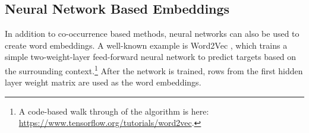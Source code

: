 \subsection{Neural Network Based Embeddings}

In addition to co-occurrence based methods, neural networks can also be used to create word embeddings. A well-known example is Word2Vec \cite{mikolov2013distributed}, which trains a simple two-weight-layer feed-forward neural network to predict targets based on the surrounding context.\footnote{A code-based walk through of the algorithm is here: \url{https://www.tensorflow.org/tutorials/word2vec}.} After the network is trained, rows from the first hidden layer weight matrix are used as the word embeddings. 




